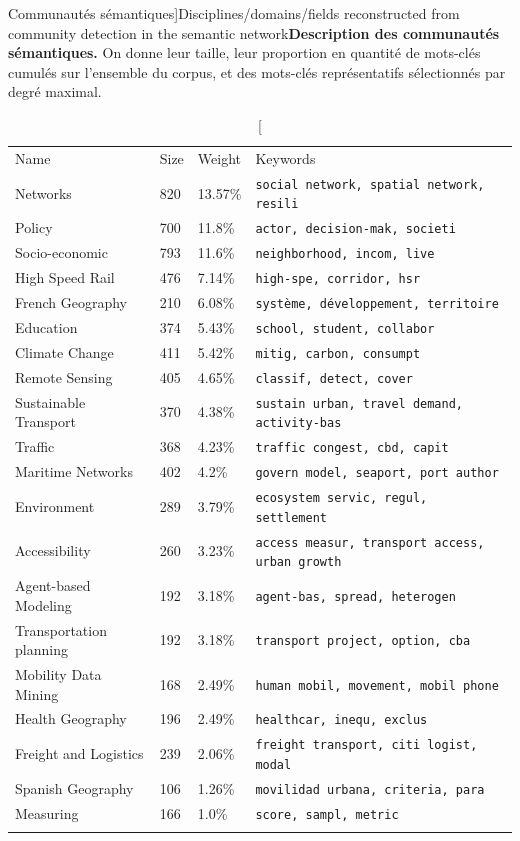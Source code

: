\begin{table}
\caption[Semantic communities][Communautés sémantiques]{Disciplines/domains/fields reconstructed from community detection in the semantic network}{\textbf{Description des communautés sémantiques.} On donne leur taille, leur proportion en quantité de mots-clés cumulés sur l'ensemble du corpus, et des mots-clés représentatifs sélectionnés par degré maximal.}
\label{tab:quantepistemo:semanticdomains}
\begin{tabular}{llll}
\hline\noalign{\smallskip}
Name & Size & Weight & Keywords  \\
\noalign{\smallskip}\hline\noalign{\smallskip}
Networks & 820 & 13.57\% & \texttt{social network, spatial network, resili} \\
Policy & 700 & 11.8\% & \texttt{actor, decision-mak, societi} \\
Socio-economic & 793 & 11.6\% & \texttt{neighborhood, incom, live} \\
High Speed Rail & 476 & 7.14\% & \texttt{high-spe, corridor, hsr} \\
French Geography & 210 & 6.08\% & \texttt{système, développement, territoire} \\
Education & 374 & 5.43\% & \texttt{school, student, collabor} \\
Climate Change & 411 & 5.42\% & \texttt{mitig, carbon, consumpt} \\
Remote Sensing & 405 & 4.65\% & \texttt{classif, detect, cover} \\
Sustainable Transport & 370 & 4.38\% & \texttt{sustain urban, travel demand, activity-bas} \\
Traffic & 368 & 4.23\% & \texttt{traffic congest, cbd, capit} \\
Maritime Networks & 402 & 4.2\% & \texttt{govern model, seaport, port author} \\
Environment & 289 & 3.79\% & \texttt{ecosystem servic, regul, settlement} \\
Accessibility & 260 & 3.23\% & \texttt{access measur, transport access, urban growth} \\
Agent-based Modeling & 192 & 3.18\% & \texttt{agent-bas, spread, heterogen} \\
Transportation planning & 192 & 3.18\% & \texttt{transport project, option, cba} \\
Mobility Data Mining & 168 & 2.49\% & \texttt{human mobil, movement, mobil phone} \\
Health Geography & 196 & 2.49\% & \texttt{healthcar, inequ, exclus} \\
Freight and Logistics & 239 & 2.06\% & \texttt{freight transport, citi logist, modal} \\
Spanish Geography & 106 & 1.26\% & \texttt{movilidad urbana, criteria, para} \\
Measuring & 166 & 1.0\% & \texttt{score, sampl, metric} \\
\noalign{\smallskip}\hline
\end{tabular}
\end{table}




